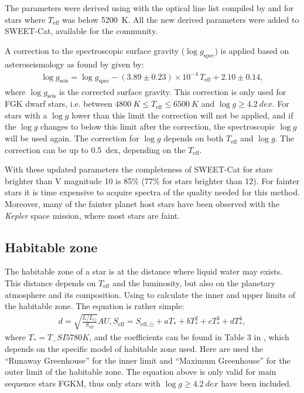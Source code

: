The parameters were derived using  with the optical line list compiled by
\citet{Sousa2008a} and \citet{Tsantaki2013} for stars where $T_\mathrm{eff}$ was below \SI{5200}{K}.
All the new derived parameters were added to SWEET-Cat, available for the community.

A correction to the spectroscopic surface gravity ($\log g_\mathrm{spec}$) is applied based on
asteroseismology as found by \citet{Mortier2014} given by:
\begin{align}
  \log g_\mathrm{seis} = \log g_\mathrm{spec} - (3.89\pm0.23)\times 10^{-4}\,T_\mathrm{eff}+2.10\pm0.14,
\end{align}
where $\log g_\mathrm{seis}$ is the corrected surface gravity. This correction is only used for FGK
dwarf stars, i.e. between $\SI{4800}{K}\leq T_\mathrm{eff}\leq\SI{6500}{K}$ and $\log
g\geq\SI{4.2}{dex}$. For stars with a $\log g$ lower than this limit the correction will not be
applied, and if the $\log g$ changes to below this limit after the correction, the spectroscopic
$\log g$ will be used again. The correction for $\log g$ depends on both $T_\mathrm{eff}$ and $\log
g$. The correction can be up to \SI{0.5}{dex}, depending on the $T_\mathrm{eff}$.

With these updated parameters the completeness of SWEET-Cat for stars brighter than V magnitude 10
is 85\% (77\% for stars brighter than 12). For fainter stars it is time expensive to acquire spectra
of the quality needed for this method. Moreover, many of the fainter planet host stars have been
observed with the \emph{Kepler} space mission, where most stars are faint.


\subsection{Habitable zone}
\label{sec:HZ}

The habitable zone of a star is at the distance where liquid water may exists. This distance depends
on $T_\mathrm{eff}$ and the luminosity, but also on the planetary atmosphere and its composition.
Using \citet[equation 3 described in][]{Kopparapu2013} to calculate the inner and upper limits of
the habitable zone. The equation is rather simple:
\begin{align}
 d = \sqrt{\frac{L/L_\odot}{S_\mathrm{eff}}} \si{AU},
 S_\mathrm{eff} = S_{\mathrm{eff},\odot} + aT_\ast + bT_\ast^2 + cT_\ast^3 + dT_\ast^4,
\end{align}
where $T_\ast=T_\mathrm-SI{5780}{K}$, and the coefficients can be found in Table 3 in
\citet{Kopparapu2013}, which depends on the specific model of habitable zone used. Here are used the
``Runaway Greenhouse'' for the inner limit and ``Maximum Greenhouse'' for the outer limit of the
habitable zone. The equation above is only valid for main sequence stars FGKM, thus only stars with
$\log g\geq\SI{4.2}{dex}$ have been included.


